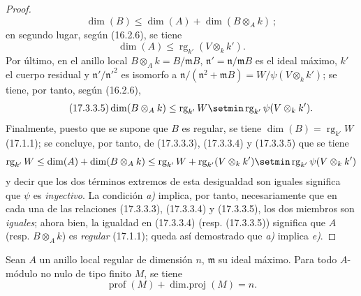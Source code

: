 \begin{proof}
\begin{equation}
\label{0.17.3.3.3-es}
\tag{17.3.3.3}
  \dim(B)\leq\dim(A)+\dim(B\otimes_A k)~;
\end{equation}
en segundo lugar, según (16.2.6), se tiene
\begin{equation}
\label{0.17.3.3.4-es}
\tag{17.3.3.4}
  \dim(A)\leq\operatorname{rg}_{k'}(V\otimes_k k').
\end{equation}
Por último, en el anillo local $B\otimes_A k=B/\mathfrak{m}B$,
$\mathfrak{n}'=\mathfrak{n}/\mathfrak{m}B$ es el ideal máximo, $k'$ el cuerpo
residual y $\mathfrak{n}'/\mathfrak{n}'^2$ es isomorfo a
$\mathfrak{n}/(\mathfrak{n}^2+\mathfrak{m}B)
=W/\psi(V\otimes_k k')$; se tiene, por tanto, según (16.2.6),
\begin{equation}
\label{0.17.3.3.5-es}
\tag{17.3.3.5}
  \dim(B\otimes_A k)
  \leq\operatorname{rg}_{k'}W
  \setmin\operatorname{rg}_{k'}\psi(V\otimes_k k').
\end{equation}
Finalmente, puesto que se supone que $B$ es regular, se tiene
$\dim(B)=\operatorname{rg}_{k'}W$ (17.1.1); se concluye, por tanto, de
(17.3.3.3), (17.3.3.4) y (17.3.3.5) que se tiene
\[
  \operatorname{rg}_{k'}W
  \leq\dim(A)+\dim(B\otimes_A k)
  \leq\operatorname{rg}_{k'}W
  +\operatorname{rg}_{k'}(V\otimes_k k')
  \setmin\operatorname{rg}_{k'}\psi(V\otimes_k k')
\]
y decir que los dos términos extremos de esta desigualdad son iguales
significa que $\psi$ es \emph{inyectivo}. La condición \emph{a)} implica, por tanto,
necesariamente que en cada una de las relaciones (17.3.3.3), (17.3.3.4) y
(17.3.3.5), los dos miembros son \emph{iguales}; ahora bien, la igualdad en
(17.3.3.4) (resp. (17.3.3.5)) significa que $A$ (resp. $B\otimes_A k$) es
\emph{regular} (17.1.1); queda así demostrado que \emph{a)} implica \emph{e)}.
\end{proof}

\begin{proposition}[17.3.4]
\label{0.17.3.4-es}
Sean $A$ un anillo local regular de dimensión $n$, $\mathfrak{m}$ su ideal
máximo. Para todo $A$-módulo no nulo de tipo finito $M$, se tiene
\begin{equation}
\label{0.17.3.4.1-es}
\tag{17.3.4.1}
  \operatorname{prof}(M)+\operatorname{dim.proj}(M)=n.
\end{equation}
\end{proposition}

